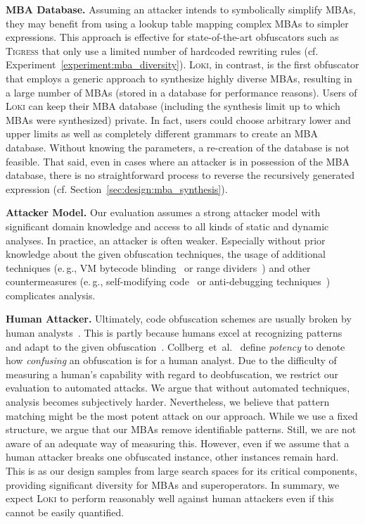 \documentclass[letterpaper,twocolumn,10pt]{article}
\newcommand{\etal}{et~al.\xspace}
\newcommand{\eg}{e.\,g.,\xspace}
\newcommand{\cf}{cf.\xspace}
\newcommand{\ex}[1]{Experiment~\ref{#1}}
\theoremstyle{customexample}
\theoremstyle{customexperiment}
\newcommand{\loki}{\textsc{Loki}\xspace}
\newcommand{\tigress}{\textsc{Tigress}\xspace}
\begin{document}
\textbf{MBA Database.}
Assuming an attacker intends to symbolically simplify MBAs, they may benefit from using a lookup table mapping complex MBAs to simpler expressions. This approach is effective for state-of-the-art obfuscators such as \tigress that only use a limited number of hardcoded rewriting rules (\cf \ex{experiment:mba_diversity}).
\loki, in contrast, is the first obfuscator that employs a generic approach to synthesize highly diverse MBAs, resulting in a large number of MBAs (stored in a database for performance reasons). Users of \loki can keep their MBA database (including the synthesis limit up to which MBAs were synthesized) private. In fact, users could choose arbitrary lower and upper limits as well as completely different grammars to create an MBA database. Without knowing the parameters, a re-creation of the database is not feasible. 
That said, even in cases where an attacker is in possession of the MBA database, there is no straightforward process to reverse the recursively generated expression (\cf Section~\ref{sec:design:mba_synthesis}).

\textbf{Attacker Model.} Our evaluation assumes a strong attacker model with significant domain knowledge and access to all kinds of static and dynamic analyses. In practice, an attacker is often weaker. Especially without prior knowledge about the given obfuscation techniques, the usage of additional techniques (\eg VM bytecode blinding~\cite{blazytko2017syntia} or range dividers~\cite{banescu2016code}) and other countermeasures (\eg self-modifying code~\cite{obf-selfmodify} or anti-debugging techniques~\cite{gagnon2007software}) complicates analysis.

\textbf{Human Attacker.} Ultimately, code obfuscation schemes are usually broken by human analysts~\cite{rolles2009unpacking}. 
This is partly because humans excel at recognizing patterns and adapt to the given obfuscation~\cite{dang2014practical}. Collberg~\etal~\cite{collberg1997taxonomy} define \emph{potency} to denote how \emph{confusing} an obfuscation is for a human analyst. Due to the difficulty of measuring a human's capability with regard to deobfuscation, we restrict our evaluation to automated attacks. We argue that without automated techniques, analysis becomes subjectively harder. Nevertheless, we believe that pattern matching might be the most potent attack on our approach. While we use a fixed structure, we argue that our MBAs remove identifiable patterns. Still, we are not aware of an adequate way of measuring this. However, even if we assume that a human attacker breaks one obfuscated instance, other instances remain hard. This is as our design samples from large search spaces for its critical components, providing significant diversity for MBAs and superoperators. In summary, we expect \loki to perform reasonably well against human attackers even if this cannot be easily quantified.
\end{document}
